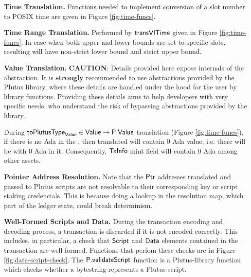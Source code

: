\textbf{Time Translation.}
Functions needed to implement conversion of a slot number to POSIX time are
given in Figure \ref{fig:time-funcs}.

\textbf{Time Range Translation.}
Performed by $\mathsf{transVITime}$ given in Figure \ref{fig:time-funcs}.
In case when both upper and lower bounds are set to specific slots,
resulting  will have non-strict lower bound
and strict upper bound.

\textbf{Value Translation.}
\textbf{CAUTION}: Details provided here expose internals of the  abstraction. 
It is \textbf{strongly} recommended to use abstractions provided by the Plutus library, 
where these details are handled under the hood for the user by library functions. 
Providing these details aims to help developers with very specific needs, 
who understand the risk of bypassing abstractions provided by the library.

During $\mathsf{toPlutusType}_{\mathsf{Value}} \in \mathsf{Value} \to \mathsf{P.Value}$ translation (Figure \ref{fig:time-funcs}),
if there is no Ada in the , then translated  will contain 0 Ada value,
i.e. there will be  with 0 Ada in it. Consequently, $\mathsf{TxInfo}$ mint field 
will contain 0 Ada  among other assets.

\textbf{Pointer Address Resolution. }
Note that the $\mathsf{Ptr}$ addresses translated and passed to Plutus scripts are
not resolvable to their corresponding key or script staking credencials. This
is because doing a lookup in the resolution map, which part of the ledger state,
could break determinism.

\textbf{Well-Formed Scripts and Data. }
During the transaction encoding and decoding process, a transaction is discarded if it is not
encoded correctly. This includes, in particular, a check that $\mathsf{Script}$ and $\mathsf{Data}$
elements contained in the transaction are well-formed. Functions that perfom these checks are
in Figure \ref{fig:data-script-check}. The $\mathsf{P.validateScript}$ function
is a Plutus-library function which checks whether a bytestring represents a
Plutus script.

